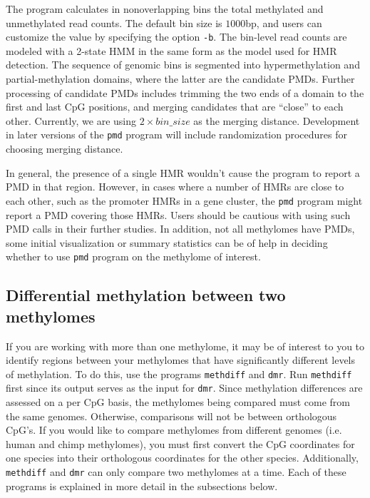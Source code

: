 \documentclass[10pt]{article}
\newcommand{\prog}[1]{\texttt{#1}}
\newcommand{\op}[1]{\texttt{#1}}
\begin{document}
The program calculates in nonoverlapping bins the total methylated and
unmethylated read counts. The default bin size is $1000$bp, and users
can customize the value by specifying the option \op{-b}. The bin-level read
counts are modeled with a 2-state HMM in the same form
as the model used for HMR detection. The sequence of genomic bins is
segmented into hypermethylation and partial-methylation domains, where
the latter are the candidate PMDs. Further processing of candidate
PMDs includes trimming the two ends of a domain to the first and last
CpG positions, and merging candidates that are ``close'' to each
other. Currently, we are using $2\times bin\_size$ as the merging
distance. Development in later versions of the \prog{pmd} program will
include randomization procedures for choosing merging distance. 

In general, the presence of a single HMR wouldn't cause the program to
report a PMD in that region. However, in cases where a number of HMRs
are close to each other, such as the promoter HMRs in a gene cluster,
the \prog{pmd} program might report a PMD covering those HMRs. Users
should be cautious with using such PMD calls in their further
studies. In addition, not all methylomes have PMDs, some initial
visualization or summary statistics can be of help in deciding whether
to use \prog{pmd} program on the methylome of interest.

 
\subsection{Differential methylation between two methylomes}
\label{sec:differential_methylation}

If you are working with more than one methylome, it may be of interest
to you to identify regions between your methylomes that have
significantly different levels of methylation. To do this, use the
programs \prog{methdiff} and \prog{dmr}. Run \prog{methdiff} first
since its output serves as the input for \prog{dmr}. Since methylation
differences are assessed on a per CpG basis, the methylomes being
compared must come from the same genomes. Otherwise, comparisons will
not be between orthologous CpG's. If you would like to compare
methylomes from different genomes (i.e. human and chimp methylomes),
you must first convert the CpG coordinates for one species into their
orthologous coordinates for the other species. Additionally,
\prog{methdiff} and \prog{dmr} can only compare two methylomes at a
time. Each of these programs is explained in more detail in the
subsections below.
\end{document}
